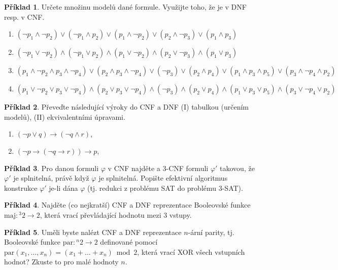 \documentclass[a4paper]{article}
\theoremstyle{definition}
\newtheorem{problem}{Příklad}
\begin{document}
    
\medskip\begin{problem} Určete množinu modelů dané formule. Využijte toho, že je v DNF resp. v CNF.
\begin{enumerate}
    \item $(\neg p_1 \wedge \neg p_2)\vee( \neg p_1 \wedge p_2)\vee( p_1 \wedge \neg p_2)\vee( p_2 \wedge \neg p_3)\vee( p_1 \wedge p_3)$
    \item $(\neg p_1 \vee \neg p_2)\wedge( \neg p_1 \vee p_2)\wedge( p_1 \vee \neg p_2)\wedge( p_2 \vee \neg p_3)\wedge( p_1 \vee p_3)$
    \item $(p_1 \wedge  \neg p_2 \wedge  p_3 \wedge  \neg p_4 )\vee(p_2 \wedge  p_3 \wedge  \neg p_4 )\vee(\neg p_3)\vee(p_2 \wedge  p_4)\vee(p_1 \wedge  p_3 \wedge  p_5 )\vee(p_3 \wedge  \neg p_4 \wedge  p_2 )$
    \item $(p_1 \vee \neg p_2 \vee p_3 \vee \neg p_4 )\wedge(p_2 \vee p_3 \vee \neg p_4 )\wedge(\neg p_3)\wedge(p_2 \vee p_4)\wedge(p_1 \vee p_3 \vee p_5 )\wedge(p_3 \vee \neg p_4 \vee p_2 )$
\end{enumerate}
\end{problem}
    
    
\medskip\begin{problem} Převeďte následující výroky do CNF a DNF (I) tabulkou (určením modelů), (II) ekvivalentními úpravami.
\begin{enumerate}
    \item $(\neg p \vee q)\to (\neg q \wedge r)$,
    \item $(\neg p \to (\neg q \to r))\to p$,
\end{enumerate}
\end{problem}
    
    
\medskip\begin{problem} Pro danou formuli $\varphi$ v CNF najděte a 3-CNF formuli $\varphi'$ takovou, že $\varphi'$ je splnitelná, právě když $\varphi$ je splnitelná. Popište efektivní algoritmus konstrukce $\varphi'$ je-li dána $\varphi$ (tj. redukci z problému SAT do problému 3-SAT).
\end{problem}
    
    
\medskip\begin{problem} Najděte (co nejkratší) CNF a DNF reprezentace Booleovské funkce $\mathrm{maj}: {^3}2\to 2$, která vrací převládající hodnotu mezi 3 vstupy.
\end{problem}
    
    
\medskip\begin{problem} Uměli byste nalézt CNF a DNF reprezentace $n$-ární parity, tj. Booleovské funkce $\mathrm{par}: {^n}2\to 2$ definované pomocí $\mathrm{par}(x_1,\dots,x_n)=(x_1+\dots+x_n)\bmod 2$,
která vrací XOR všech vstupních hodnot? Zkuste to pro malé hodnoty $n$.
\end{problem}
    
\end{document}
